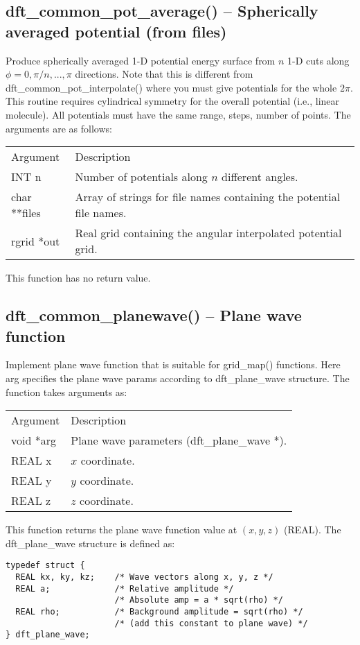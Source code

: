 \documentclass[12pt,letterpaper]{report}
\begin{document}
\subsection{dft\_common\_pot\_average() -- Spherically averaged potential (from files)}

Produce spherically averaged 1-D potential energy surface from $n$ 1-D cuts along $\phi = 0, \pi/n, ..., \pi$ directions. Note that this is different from dft\_common\_pot\_interpolate() where you must give potentials for the whole $2\pi$. 
This routine requires cylindrical symmetry for the overall potential (i.e., linear molecule). All potentials must have the same range, steps, number of points. The arguments are as follows:
\begin{longtable}{p{} p{}}
Argument & Description\\
\cline{1-2}
INT n  & Number of potentials along $n$ different angles.\\
char **files & Array of strings for file names containing the potential file names.\\
rgrid *out & Real grid containing the angular interpolated potential grid.\\
\end{longtable}
\noindent
This function has no return value.

\subsection{dft\_common\_planewave() -- Plane wave function}

Implement plane wave function that is suitable for grid\_map() functions. Here arg specifies the plane wave params according to dft\_plane\_wave structure. The function takes arguments as:
\begin{longtable}{p{} p{}}
Argument & Description\\
\cline{1-2}
void *arg & Plane wave parameters (dft\_plane\_wave *).\\
REAL x & $x$ coordinate.\\
REAL y & $y$ coordinate.\\
REAL z & $z$ coordinate.\\
\end{longtable}
\noindent
This function returns the plane wave function value at $(x, y, z)$ (REAL). The dft\_plane\_wave structure is defined as:
\begin{verbatim}
typedef struct {
  REAL kx, ky, kz;    /* Wave vectors along x, y, z */
  REAL a;             /* Relative amplitude */
                      /* Absolute amp = a * sqrt(rho) */
  REAL rho;           /* Background amplitude = sqrt(rho) */
                      /* (add this constant to plane wave) */
} dft_plane_wave;
\end{verbatim}
\end{document}
